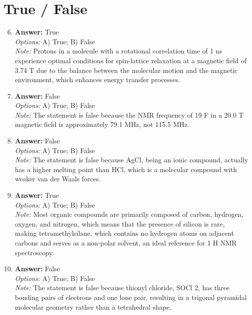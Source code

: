 \documentclass[12pt]{article}
\begin{document}
\section*{True / False}
\begin{enumerate}[label=\arabic*.]
\setcounter{enumi}{5}
\item \textbf{Answer:} True
\\ \textit{Options:} A) True; B) False
\\ \textit{Note:} Protons in a molecule with a rotational correlation time of 1 ns experience optimal conditions for spin-lattice relaxation at a magnetic field of 3.74 T due to the balance between the molecular motion and the magnetic environment, which enhances energy transfer processes.
\item \textbf{Answer:} False
\\ \textit{Options:} A) True; B) False
\\ \textit{Note:} The statement is false because the NMR frequency of 19 F in a 20.0 T magnetic field is approximately 79.1 MHz, not 115.5 MHz.
\item \textbf{Answer:} False
\\ \textit{Options:} A) True; B) False
\\ \textit{Note:} The statement is false because AgCl, being an ionic compound, actually has a higher melting point than HCl, which is a molecular compound with weaker van der Waals forces.
\item \textbf{Answer:} True
\\ \textit{Options:} A) True; B) False
\\ \textit{Note:} Most organic compounds are primarily composed of carbon, hydrogen, oxygen, and nitrogen, which means that the presence of silicon is rare, making tetramethylsilane, which contains no hydrogen atoms on adjacent carbons and serves as a non-polar solvent, an ideal reference for 1 H NMR spectroscopy.
\item \textbf{Answer:} False
\\ \textit{Options:} A) True; B) False
\\ \textit{Note:} The statement is false because thionyl chloride, SOCl 2, has three bonding pairs of electrons and one lone pair, resulting in a trigonal pyramidal molecular geometry rather than a tetrahedral shape.
\end{enumerate}
\end{document}
